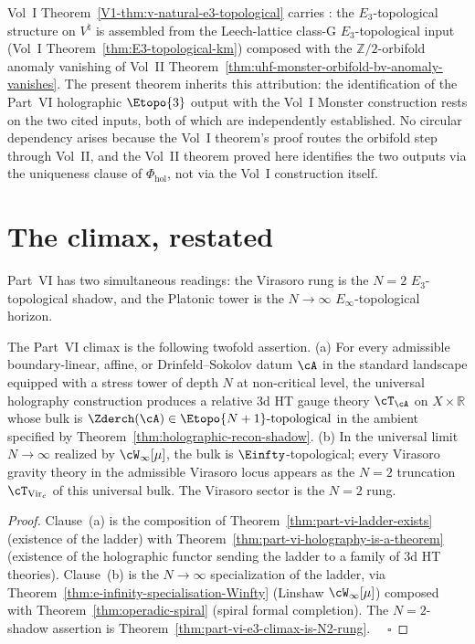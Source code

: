 \begin{remark}
\label{rem:part-vi-moonshine-recovery-scope}
Vol~I Theorem~\ref{V1-thm:v-natural-e3-topological} carries
\ClaimStatusProvedElsewhere: the $E_{3}$-topological structure on
$V^\natural$ is assembled from the Leech-lattice class-G
$E_{3}$-topological input (Vol~I Theorem~\ref{thm:E3-topological-km})
composed with the $\mathbb{Z}/2$-orbifold anomaly vanishing of
Vol~II Theorem~\ref{thm:uhf-monster-orbifold-bv-anomaly-vanishes}.
The present theorem inherits this attribution: the identification of
the Part~VI holographic $\Etopo{3}$ output with the Vol~I Monster
construction rests on the two cited inputs, both of which are
independently established. No circular dependency arises because the
Vol~I theorem's proof routes the orbifold step through Vol~II, and
the Vol~II theorem proved here identifies the two outputs via the
uniqueness clause of $\Phi_{\mathrm{hol}}$, not via the Vol~I
construction itself.
\end{remark}

\section{The climax, restated}
\label{sec:part-vi-climax-restated}

Part~VI has two simultaneous readings: the Virasoro rung is the
$N=2$ $E_3$-topological shadow, and the Platonic tower is the
$N\to\infty$ $E_\infty$-topological horizon.

\begin{proposition}
\label{prop:part-vi-climax-restated}
The Part~VI climax is the following twofold assertion.
\textup{(}a\textup{)} For every admissible boundary-linear, affine, or
Drinfeld--Sokolov datum $\cA$ in the standard landscape equipped with a
stress tower of depth $N$ at non-critical level, the universal
holography construction produces a relative 3d HT gauge theory
$\cT_\cA$ on $X \times \mathbb{R}$ whose bulk is
$\Zderch(\cA) \in \Etopo{N+1}\text{-topological}$ in the ambient
specified by Theorem~\ref{thm:holographic-recon-shadow}.
\textup{(}b\textup{)} In the universal limit $N \to \infty$ realized by
$\cW_\infty[\mu]$, the bulk is $\Einfty$-topological; every Virasoro
gravity theory in the admissible Virasoro locus appears as the $N=2$
truncation $\cT_{\mathrm{Vir}_c}$
of this universal bulk. The Virasoro sector is the $N=2$ rung.
\end{proposition}
\begin{proof}
Clause~(a) is the composition of
Theorem~\ref{thm:part-vi-ladder-exists} (existence of the ladder) with
Theorem~\ref{thm:part-vi-holography-is-a-theorem} (existence of the
holographic functor sending the ladder to a family of 3d HT theories).
Clause~(b) is the $N \to \infty$ specialization of the ladder, via
Theorem~\ref{thm:e-infinity-specialisation-Winfty} (Linshaw
$\cW_\infty[\mu]$) composed with
Theorem~\ref{thm:operadic-spiral} (spiral formal completion). The
$N=2$-shadow assertion is
Theorem~\ref{thm:part-vi-e3-climax-is-N2-rung}. $\quad\square$
\end{proof}

